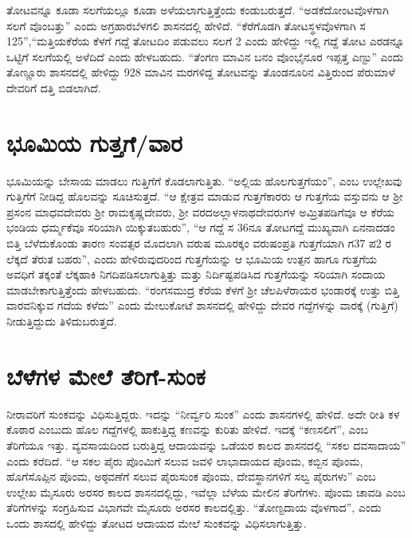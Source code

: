ತೋಟವನ್ನೂ ಕೂಡಾ ಸಲಗೆಯಲ್ಲೂ ಕೂಡಾ ಅಳೆಯಲಾಗುತ್ತಿತ್ತೆಂದು ಕಂಡುಬರುತ್ತದೆ. “ಅಡಕೆದೋಂಟವೊಳ\-ಗಾಗಿ ಸಲಗೆ ವೊಂಬತ್ತು” ಎಂದು ಅಗ್ರಹಾರಬೆಳಗಲಿ ಶಾಸನದಲ್ಲಿ ಹೇಳಿದೆ. “ಕೆರೆಗೊಡಗಿ ತೋಟಸ್ಥಳವೊಳಗಾಗಿ ಸ 125”,\break “ಮತ್ತಿಯಕೆರೆಯ ಕೆಳಗೆ ಗದ್ದೆ ತೋಟದಿಂ ಪಡುವಲು ಸಲಗೆ 2 ಎಂದು ಹೇಳಿದ್ದು ಇಲ್ಲಿ ಗದ್ದೆ ತೋಟ ಎರಡನ್ನೂ ಒಟ್ಟಿಗೆ ಸಲಗೆಯಲ್ಲಿ ಅಳೆದಿದೆ ಎಂದು ಹೇಳಬಹುದು. “ತೆಂಗಣ ಮಾವಿನ ಬನಂ ವೊಂಭೈನೂರ ಇಪ್ಪತ್ತ ಎಣ್ಟು” ಎಂದು ತೊಣ್ಣೂರು ಶಾಸನದಲ್ಲಿ ಹೇಳಿದ್ದು 928 ಮಾವಿನ ಮರಗಳಿದ್ದ ತೋಟವನ್ನು ತೊಂಡನೂರಿನ ವಿತ್ತಿರುಂದ ಪೆರುಮಾಳೆ ದೇವರಿಗೆ ದತ್ತಿ ಬಿಡಲಾಗಿದೆ.


\section{ಭೂಮಿಯ ಗುತ್ತಗೆ/ವಾರ}

ಭೂಮಿಯನ್ನು ಬೇಸಾಯ ಮಾಡಲು ಗುತ್ತಿಗೆಗೆ ಕೊಡಲಾಗುತ್ತಿತು. “ಅಲ್ಲಿಯ ಹೊಲಗುತ್ತಗೆಯಂ”, ಎಂಬ ಉಲ್ಲೇಖವು ಗುತ್ತಿಗೆಗೆ ನೀಡಿದ್ದ ಹೊಲವನ್ನು ಸೂಚಿಸುತ್ತದೆ. “ಆ ಕ್ಷೇತ್ರವ ಮಾಡುವ ಗುತ್ತಗೆಕಾರರು ಆ ಗುತ್ತಗೆಯ ವಸ್ತುವನು ಆ ಶ‍್ರೀ ಪ್ರಸಂನ ಮಾಧವದೇವರು ಶ‍್ರೀ ರಾಮಕೃಷ್ಣದೇವರು, ಶ‍್ರೀ ವರದಅಲ್ಲಾಳನಾಥದೇವರುಗಳ ಅಮ್ರಿತಪಡಿಗೆವೂ ಆ ಕೆರೆಯ ಭಂಡಿಯ ಧರ್ಮ್ಮಕೆವೂ ಸರಿಯಾಗಿ ಯಿಕ್ಕುತಬಹುರು”, “ಆ ಗದ್ದೆ ಸ 36ನೂ ತೋಟಗದ್ದೆ ಮುಖ್ಯವಾಗಿ ಏನನಾದಡಂ ಬಿತ್ತಿ ಬೆಳೆದುಕೊಂಡು ತಾರಣ ಸಂವತ್ಸರ ಮೊದಲಾಗಿ ವರುಷ ಮೂರಕ್ಕಂ ವರುಷಂಪ್ರತಿ ಗುತ್ತಗೆಯಾಗಿ ಗ37 ಪ2 ರ ಲೆಕ್ಕದೆ ತೆರುತ ಬಹರು”, ಎಂದು ಹೇಳಿರುವುದರಿಂದ ಗುತ್ತಗೆಯನ್ನು ಆ ಭೂಮಿಯ ಉತ್ಪನ ಹಾಗೂ ಗುತ್ತಗೆಯ ಅವಧಿಗೆ ತಕ್ಕಂತೆ ಲೆಕ್ಕಹಾಕಿ ನಿಗದಿಪಡಿಸಲಾಗುತ್ತಿತ್ತು ಮತ್ತು ನಿರ್ದಿಷ್ಟಪಡಿಸಿದ ಗುತ್ತಗೆಯನ್ನು ಸರಿಯಾಗಿ ಸಂದಾಯ ಮಾಡಬೇಕಾಗುತ್ತಿತ್ತೆಂದು ಹೇಳಬಹುದು. “ರಂಗಸಮುದ್ರ ಕೆರೆಯ ಕೆಳಗೆ ಶ‍್ರೀ ಚೆಲಪಿಳೆರಾಯರ ಭಂಡಾರಕ್ಕೆ ಉತ್ತು ಬಿತ್ತಿ ವಾರವನಿಕ್ಕುವ ಗದೆಯ ಕಳೆದು” ಎಂದು ಮೇಲುಕೋಟೆ ಶಾಸನದಲ್ಲಿ ಹೇಳಿದ್ದು ದೇವರ ಗದ್ದೆಗಳನ್ನು ವಾರಕ್ಕೆ (ಗುತ್ತಿಗೆ) ನೀಡುತ್ತಿದ್ದುದು ತಿಳಿದುಬರುತ್ತದೆ.


\section{ಬೆಳೆಗಳ ಮೇಲೆ ತೆರಿಗೆ-ಸುಂಕ}

ನೀರಾವರಿಗೆ ಸುಂಕವನ್ನು ವಿಧಿಸುತ್ತಿದ್ದರು. ಇದನ್ನು “ನೀರ್ವ್ವರಿ ಸುಂಕ” ಎಂದು ಶಾಸನಗಳಲ್ಲಿ ಹೇಳಿದೆ. ಅದೇ ರೀತಿ ಕಳ ಕೊಠಾರ ಎಂಬುದು ಹೊಲ ಗದ್ದೆಗಳಲ್ಲಿ ಹಾಕುತ್ತಿದ್ದ ಕಣವನ್ನು ಕುರಿತು ಹೇಳಿದೆ. ಇದಕ್ಕೆ “ಕಣಸಲಿಗೆ”, ಎಂಬ ತೆರಿಗೆಯೂ ಇತ್ತು. ವ್ಯವಸಾಯದಿಂದ ಬರುತ್ತಿದ್ದ ಆದಾಯವನ್ನು ಒಡೆಯರ ಕಾಲದ ಶಾಸನದಲ್ಲಿ “ಸಕಲ ದವಸಾದಾಯ” ಎಂದು ಕರೆದಿದೆ. “ಆ ಸಕಲ ಪೈರು ಪೊಂಮಿಗೆ ಸಲುವ ಜವಳಿ ಲಾಭಾದಾಯದ ಪೊಂಮ, ಕಬ್ಬಿನ ಪೊಂಮ, ಹೊಗೆಸೊಪ್ಪಿನ ಪೊಂಮ, ಅಠ್ಠವಣೆಗೆ ಸಲುವ ಪೈರುಸುಂಕ ಪೊಂಮ, ದೇವಸ್ಥಾನಗಳಿಗೆ ಸಲ್ವ ಪೈರುಗಳು” ಎಂಬ ಉಲ್ಲೇಖ ಮೈಸೂರು ಅರಸರ ಕಾಲದ ಶಾಸನದಲ್ಲಿದ್ದು, ಇವೆಲ್ಲಾ ಬೆಳೆಯ ಮೇಲಿನ ತೆರಿಗೆಗಳು. ಪೊಂಮ ಚಾವಡಿ ಎಂಬ ತೆರಿಗೆಗಳನ್ನು ಸಂಗ್ರಹಿಸುವ ವಿಭಾಗವೇ ಮೈಸೂರು ಅರಸರ ಕಾಲದಲ್ಲಿತ್ತು. “ತೋಣ್ಟದಾಯ ವೊಳಗಾದ”, ಎಂದು ಒಂದು ಶಾಸದಲ್ಲಿ ಹೇಳಿದ್ದು ತೋಟದ ಆದಾಯದ ಮೇಲೆ ಸುಂಕವನ್ನು ವಿಧಿಸಲಾಗುತ್ತಿತ್ತು.


